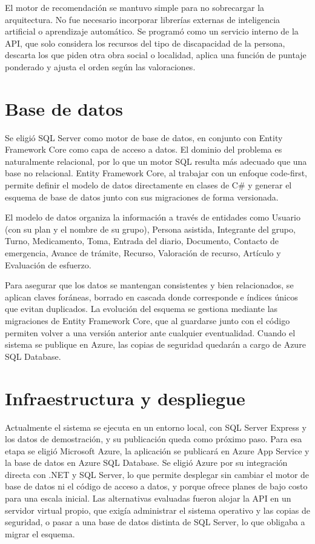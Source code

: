 El motor de recomendación se mantuvo simple para no sobrecargar la arquitectura. No fue necesario incorporar librerías externas de inteligencia artificial o aprendizaje automático. Se programó como un servicio interno de la API, que solo considera los recursos del tipo de discapacidad de la persona, descarta los que piden otra obra social o localidad, aplica una función de puntaje ponderado y ajusta el orden según las valoraciones.

\section{Base de datos}

Se eligió SQL Server como motor de base de datos, en conjunto con Entity Framework Core como capa de acceso a datos. El dominio del problema es naturalmente relacional, por lo que un motor SQL resulta más adecuado que una base no relacional. Entity Framework Core, al trabajar con un enfoque code-first, permite definir el modelo de datos directamente en clases de C\# y generar el esquema de base de datos junto con sus migraciones de forma versionada.

El modelo de datos organiza la información a través de entidades como Usuario (con su plan y el nombre de su grupo), Persona asistida, Integrante del grupo, Turno, Medicamento, Toma, Entrada del diario, Documento, Contacto de emergencia, Avance de trámite, Recurso, Valoración de recurso, Artículo y Evaluación de esfuerzo.

Para asegurar que los datos se mantengan consistentes y bien relacionados, se aplican claves foráneas, borrado en cascada donde corresponde e índices únicos que evitan duplicados. La evolución del esquema se gestiona mediante las migraciones de Entity Framework Core, que al guardarse junto con el código permiten volver a una versión anterior ante cualquier eventualidad. Cuando el sistema se publique en Azure, las copias de seguridad quedarán a cargo de Azure SQL Database.

\section{Infraestructura y despliegue}

Actualmente el sistema se ejecuta en un entorno local, con SQL Server Express y los datos de demostración, y su publicación queda como próximo paso. Para esa etapa se eligió Microsoft Azure, la aplicación se publicará en Azure App Service y la base de datos en Azure SQL Database. Se eligió Azure por su integración directa con .NET y SQL Server, lo que permite desplegar sin cambiar el motor de base de datos ni el código de acceso a datos, y porque ofrece planes de bajo costo para una escala inicial. Las alternativas evaluadas fueron alojar la API en un servidor virtual propio, que exigía administrar el sistema operativo y las copias de seguridad, o pasar a una base de datos distinta de SQL Server, lo que obligaba a migrar el esquema.

